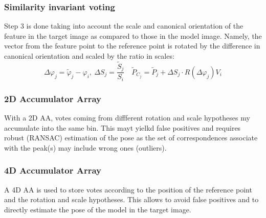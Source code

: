 \documentclass{article}
\begin{document}
\subsubsection{Similarity invariant voting}
Step 3 is done taking into account the scale and canonical orientation of the feature in the target image as compared to those in the model image. Namely, the vector from the feature point to the reference point is rotated by the difference in canonical orientation and scaled by the ratio in scales:
\[
    \Delta\varphi_j = \tilde{\varphi}_j - \varphi_i, \ \Delta S_j = \displaystyle\frac{\tilde{S}_j}{S_i} \quad \tilde{P}_{C_j} = \tilde{P}_j + \Delta S_j\cdot R(\Delta\varphi_j) V_i
\]
\subsubsection{2D Accumulator Array}
With a 2D AA, votes coming from diffferent rotation and scale hypotheses my accumulate into the same bin. This mayt yielkd false positives and requires robust (RANSAC) estimation of the pose as the set of correspondences associate with the peak(s) may include wrong ones (outliers).
\subsubsection{4D Accumulator Array}
A 4D AA is used to store votes according to the position of the reference point and the rotation and scale hypotheses. This allows to avoid false positives and to directly estimate the pose of the model in the target image.
\end{document}
